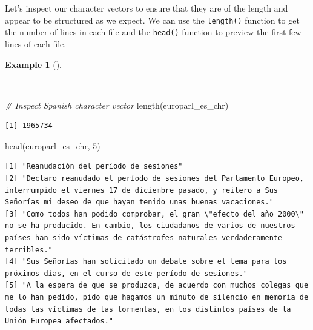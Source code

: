 \documentclass[
  letterpaper,
  krantz1]{latex/krantz-mod}
\newenvironment{Shaded}{\begin{snugshade}}{\end{snugshade}}
\newcommand{\CommentTok}[1]{\textcolor[rgb]{0.00,0.00,0.00}{\textit{#1}}}
\newcommand{\DecValTok}[1]{\textcolor[rgb]{0.00,0.00,0.00}{#1}}
\newcommand{\FunctionTok}[1]{\textcolor[rgb]{0.00,0.00,0.00}{#1}}
\newcommand{\NormalTok}[1]{\textcolor[rgb]{0.00,0.00,0.00}{#1}}
\theoremstyle{definition}
\newtheorem{example}{Example}[chapter]
\theoremstyle{definition}
\theoremstyle{remark}
\begin{document}
Let's inspect our character vectors to ensure that they are of the
length and appear to be structured as we expect. We can use the
\texttt{length()} function to get the number of lines in each file and
the \texttt{head()} function to preview the first few lines of each
file.

\begin{example}[]\protect\hypertarget{exm-curate-europarl-inspect-chr}{}\label{exm-curate-europarl-inspect-chr}

~

\begin{Shaded}
\begin{Highlighting}[numbers=left,,]
\CommentTok{\# Inspect Spanish character vector}
\FunctionTok{length}\NormalTok{(europarl\_es\_chr)}
\end{Highlighting}
\end{Shaded}

\begin{verbatim}
[1] 1965734
\end{verbatim}

\begin{Shaded}
\begin{Highlighting}[numbers=left,,]
\FunctionTok{head}\NormalTok{(europarl\_es\_chr, }\DecValTok{5}\NormalTok{)}
\end{Highlighting}
\end{Shaded}

\begin{verbatim}
[1] "Reanudación del período de sesiones"                                                                                                                                                                                                 
[2] "Declaro reanudado el período de sesiones del Parlamento Europeo, interrumpido el viernes 17 de diciembre pasado, y reitero a Sus Señorías mi deseo de que hayan tenido unas buenas vacaciones."                                      
[3] "Como todos han podido comprobar, el gran \"efecto del año 2000\" no se ha producido. En cambio, los ciudadanos de varios de nuestros países han sido víctimas de catástrofes naturales verdaderamente terribles."                    
[4] "Sus Señorías han solicitado un debate sobre el tema para los próximos días, en el curso de este período de sesiones."                                                                                                                
[5] "A la espera de que se produzca, de acuerdo con muchos colegas que me lo han pedido, pido que hagamos un minuto de silencio en memoria de todas las víctimas de las tormentas, en los distintos países de la Unión Europea afectados."
\end{verbatim}


\end{example}
\end{document}
